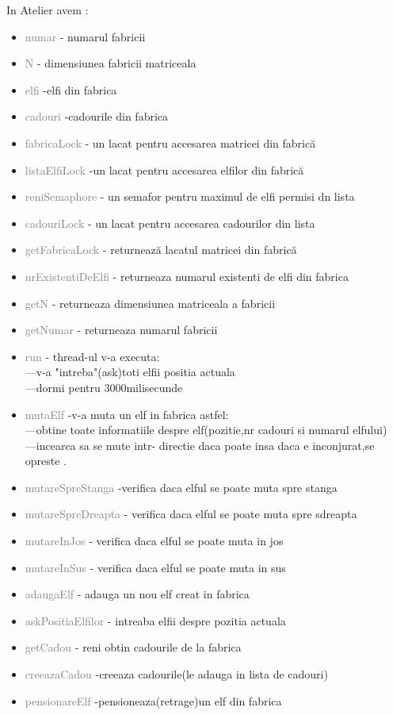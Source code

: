 \documentclass{article}
\begin{document}
In Atelier avem :
\begin{itemize}
\item  \textcolor{Gray}{numar} - numarul fabricii
\item \textcolor{Gray}{N} - dimensiunea fabricii matriceala
\item \textcolor{Gray}{elfi} -elfi din fabrica
\item \textcolor{Gray}{cadouri} -cadourile din fabrica
\item \textcolor{Gray}{fabricaLock} - un lacat pentru accesarea matricei din fabrică
\item \textcolor{Gray}{listaElfiLock} -un lacat pentru accesarea elfilor din fabrică 
\item \textcolor{Gray}{reniSemaphore} - un semafor pentru maximul de elfi permisi dn lista
\item \textcolor{Gray}{cadouriLock} - un lacat pentru accesarea cadourilor din lista 
\item \textcolor{Gray}{getFabricaLock} - returnează lacatul matricei din fabrică
\item \textcolor{Gray}{nrExistentiDeElfi} - returneaza numarul existenti de elfi din fabrica
\item  \textcolor{Gray}{getN} - returneaza dimensiunea matriceala a fabricii
\item \textcolor{Gray}{getNumar} - returneaza numarul fabricii
\item \textcolor{Gray}{run} - thread-ul v-a executa:\\
---v-a "intreba"(ask)toti elfii positia actuala\\
---dormi pentru 3000milisecunde
\item \textcolor{Gray}{mutaElf} -v-a muta un elf in fabrica astfel:\\
---obtine toate informatiile despre elf(pozitie,nr cadouri si numarul elfului)\\
---incearca sa se mute intr- directie daca poate insa daca e inconjurat,se opreste .
\item \textcolor{Gray}{mutareSpreStanga} -verifica daca elful se poate muta spre stanga
\item \textcolor{Gray}{mutareSpreDreapta} - verifica daca elful se poate muta spre sdreapta
\item \textcolor{Gray}{mutareInJos} - verifica daca elful se poate muta in jos
\item \textcolor{Gray}{mutareInSus} - verifica daca elful se poate muta in sus
\item \textcolor{Gray}{adaugaElf} - adauga un nou elf creat in fabrica
\item \textcolor{Gray}{askPositiaElfilor} - intreaba elfii despre pozitia actuala
\item \textcolor{Gray}{getCadou} - reni obtin cadourile de la fabrica
\item \textcolor{Gray}{creeazaCadou} -creeaza cadourile(le adauga in lista de cadouri)
\item \textcolor{Gray}{pensionareElf} -pensioneaza(retrage)un elf din fabrica
\end{itemize}
\end{document}
